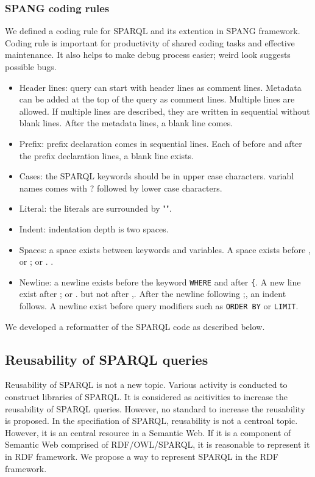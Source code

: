 \documentclass[runningheads]{llncs}
\begin{document}
\subsubsection{SPANG coding rules}
We defined a coding rule for SPARQL and its extention in SPANG framework. Coding rule is important for productivity of shared coding tasks and effective maintenance. It also helps to make debug process easier; weird look suggests possible bugs. 
\begin{itemize}
    \item Header lines: query can start with header lines as comment lines. Metadata can be added at the top of the query as comment lines. Multiple lines are allowed. If multiple lines are described, they are written in sequential without blank lines. After the metadata lines, a blank line comes.
    \item Prefix: prefix declaration comes in sequential lines. Each of before and after the prefix declaration lines, a blank line exists.
    \item Cases: the SPARQL keywords should be in upper case characters. variabl names comes with ? followed by lower case characters.
    \item Literal: the literals are surrounded by "".
    \item Indent: indentation depth is two spaces.
    \item Spaces: a space exists between keywords and variables. A space exists before , or ; or . .
    \item Newline: a newline exists before the keyword \texttt{WHERE} and after \texttt{\{}. A new line exist after ; or . but not after ,. After the newline following ;, an indent follows. A newline exist before query modifiers such as \texttt{ORDER BY} or \texttt{LIMIT}.
\end{itemize}
We developed a reformatter of the SPARQL code as described below.

\subsection{Reusability of SPARQL queries}
Reusability of SPARQL is not a new topic. Various activity is conducted to construct libraries of SPARQL. It is considered as acitivities to increase the reusability of SPARQL queries. However, no standard to increase the reusability is proposed. In the specifiation of SPARQL, reusability is not a centroal topic. However, it is an central resource in a Semantic Web. If it is a component of Semantic Web comprised of RDF/OWL/SPARQL, it is reasonable to represent it in RDF framework. We propose a way to represent SPARQL in the RDF framework.
\end{document}
